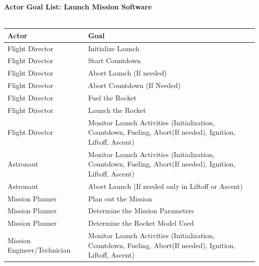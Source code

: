 \documentclass[letterpaper]{article}
\begin{document}
\noindent
\textbf{Actor Goal List:  Launch Mission Software}\\\\
\vspace{4ex}
\begin{tabular}{|p{5cm}|p{5cm}|}\hline
\textbf{Actor} & \textbf{Goal}\\\hline
Flight Director & Initialize Launch\\\hline
Flight Director & Start Countdown\\\hline
Flight Director & Abort Launch (If needed)\\\hline
Flight Director & Abort Countdown (If Needed)\\\hline
Flight Director & Fuel the Rocket\\\hline
Flight Director & Launch the Rocket\\\hline
Flight Director & Monitor Launch Activities (Initialization,
Countdown, Fueling, Abort(If needed), Ignition, Liftoff, Ascent)
\\\hline
Astronaut & Monitor Launch Activities (Initialization,
Countdown, Fueling, Abort(If needed), Ignition, Liftoff, Ascent)
\\\hline
Astronaut & Abort Launch (If needed only in Liftoff or Ascent)\\\hline
Mission Planner & Plan out the Mission\\\hline
Mission Planner & Determine the Mission Parameters\\\hline
Mission Planner & Determine the Rocket Model Used\\\hline
Mission Engineer/Technician & Monitor Launch Activities 
(Initialization, Countdown, Fueling, Abort(If needed), Ignition,
Liftoff, Ascent)
\\\hline
\end{tabular}
\end{document}
